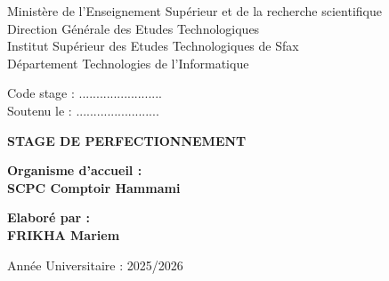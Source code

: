 \documentclass[12pt, a4paper]{report}
\begin{document}
\begin{titlepage}
    \centering
    {\small Ministère de l’Enseignement Supérieur et de la recherche scientifique\\
    Direction Générale des Etudes Technologiques\\
    Institut Supérieur des Etudes Technologiques de Sfax\\
    Département Technologies de l’Informatique\par}
    
    \vspace{2cm}
    
    \begin{flushleft}
    Code stage : ........................\\
    Soutenu le : ........................
    \end{flushleft}
    
    \vspace{2cm}
    
    {\Huge \textbf{STAGE DE PERFECTIONNEMENT}\par}
    
    \vspace{2cm}
    
    \begin{minipage}{0.45\textwidth}
        \textbf{Organisme d’accueil :}\\[0.5cm]
        \textbf{SCPC Comptoir Hammami}
    \end{minipage}
    \hfill
    \begin{minipage}{0.45\textwidth}
        \textbf{Elaboré par :}\\[0.5cm]
        \textbf{FRIKHA Mariem}
    \end{minipage}
    
    \vfill
    
    {\large Année Universitaire : 2025/2026\par}
\end{titlepage}

\tableofcontents
\newpage

\listoffigures
{}
\newpage

\listoftables
{}
\newpage



\newpage


\newpage


\newpage


\newpage


\newpage


\newpage


\newpage


\newpage


\newpage


\newpage


\end{document}
